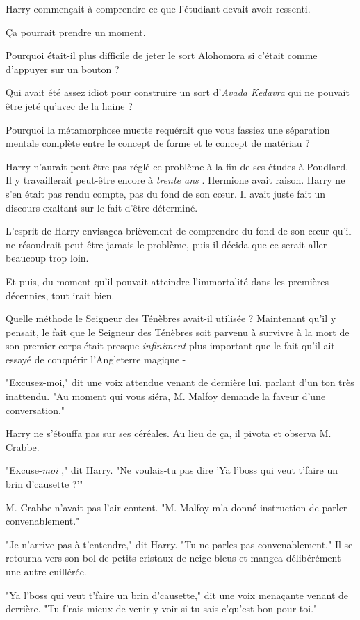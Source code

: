 Harry commençait à comprendre ce que l'étudiant devait avoir ressenti.

Ça pourrait prendre un moment.

Pourquoi était-il plus difficile de jeter le sort Alohomora si c'était comme d'appuyer sur un bouton ?

Qui avait été assez idiot pour construire un sort d'\emph{Avada Kedavra} qui ne pouvait être jeté qu'avec de la haine ?

Pourquoi la métamorphose muette requérait que vous fassiez une séparation mentale complète entre le concept de forme et le concept de matériau ?

Harry n'aurait peut-être pas réglé ce problème à la fin de ses études à Poudlard. Il y travaillerait peut-être encore à \emph{trente ans} . Hermione avait raison. Harry ne s'en était pas rendu compte, pas du fond de son cœur. Il avait juste fait un discours exaltant sur le fait d'être déterminé.

L'esprit de Harry envisagea brièvement de comprendre du fond de son cœur qu'il ne résoudrait peut-être jamais le problème, puis il décida que ce serait aller beaucoup trop loin.

Et puis, du moment qu'il pouvait atteindre l'immortalité dans les premières décennies, tout irait bien.

Quelle méthode le Seigneur des Ténèbres avait-il utilisée ? Maintenant qu'il y pensait, le fait que le Seigneur des Ténèbres soit parvenu à survivre à la mort de son premier corps était presque \emph{infiniment} plus important que le fait qu'il ait essayé de conquérir l'Angleterre magique -

"Excusez-moi," dit une voix attendue venant de dernière lui, parlant d'un ton très inattendu. "Au moment qui vous siéra, M. Malfoy demande la faveur d'une conversation."

Harry ne s'étouffa pas sur ses céréales. Au lieu de ça, il pivota et observa M. Crabbe.

"Excuse-\emph{moi} ," dit Harry. "Ne voulais-tu pas dire 'Ya l'boss qui veut t'faire un brin d'causette ?'"

M. Crabbe n'avait pas l'air content. "M. Malfoy m'a donné instruction de parler convenablement."

"Je n'arrive pas à t'entendre," dit Harry. "Tu ne parles pas convenablement." Il se retourna vers son bol de petits cristaux de neige bleus et mangea délibérément une autre cuillérée.

"Ya l'boss qui veut t'faire un brin d'causette," dit une voix menaçante venant de derrière. "Tu f'rais mieux de venir y voir si tu sais c'qu'est bon pour toi."

